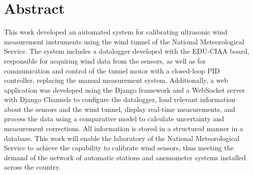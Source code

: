 \chapter*{Abstract}
This work developed an automated system for calibrating ultrasonic wind measurement instruments using the wind tunnel of the National Meteorological Service. The system includes a datalogger developed with the EDU-CIAA board, responsible for acquiring wind data from the sensors, as well as for communication and control of the tunnel motor with a closed-loop PID controller, replacing the manual measurement system. Additionally, a web application was developed using the Django framework and a WebSocket server with Django Channels to configure the datalogger, load relevant information about the sensors and the wind tunnel, display real-time measurements, and process the data using a comparative model to calculate uncertainty and measurement corrections. All information is stored in a structured manner in a database. This work will enable the laboratory of the National Meteorological Service to achieve the capability to calibrate wind sensors, thus meeting the demand of the network of automatic stations and anemometer systems installed across the country.